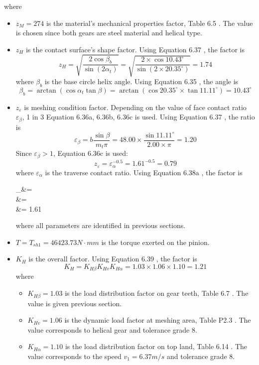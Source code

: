 where
\begin{itemize}
	\item $ z_M = 274 $ is the material's mechanical properties factor, Table 6.5 \cite{tk1}. The value is chosen since both gears are steel material and helical type.
	\item $ z_H $ is the contact surface's shape factor. Using Equation 6.37 \cite{tk1}, the factor is
	\[ z_H = \sqrt{\dfrac{2\cos\beta_b}{\sin(2\alpha_t)}} = \sqrt{\dfrac{2\times\cos 10.43^\circ}{\sin(2\times 20.35^\circ)}} = 1.74\]
	where $ \beta_b $ is the base circle helix angle. Using Equation 6.35 \cite{tk1}, the angle is
	\[ \beta_b = \arctan\left( \cos\alpha_t\tan\beta\right) = \arctan\left( \cos 20.35^\circ \times \tan 11.11^\circ\right) = 10.43^\circ\]
	\item $ z_\varepsilon $ is meshing condition factor. Depending on the value of face contact ratio $ \varepsilon_\beta $, 1 in 3 Equation 6.36a, 6.36b, 6.36c \cite{tk1} is used. Using Equation 6.37 \cite{tk1}, the ratio is
	\[\varepsilon_\beta = b\dfrac{\sin\beta}{m_t\pi} = 48.00\times\dfrac{\sin 11.11^\circ}{2.00\times\pi}=1.20\]
	Since $ \varepsilon_\beta >1 $, Equation 6.36c \cite{tk1} is used:
	\[z_\varepsilon = \varepsilon_\alpha^{-0.5} = 1.61^{-0.5} = 0.79\]	
	where $ \varepsilon_\alpha $ is the traverse contact ratio. Using Equation 6.38a \cite{tk1}, the factor is
	\begin{flalign*}
	\varepsilon_\alpha &= \\
	&= \\
	&= 1.61
	\end{flalign*}
	where all parameters are identified in previous sections.
	\item $ T=T_{sh1}=46423.73\unit{N\cdot mm} $ is the torque exerted on the pinion.
	\item $ K_H $ is the overall factor. Using Equation 6.39 \cite{tk1}, the factor is
	\[ K_H = K_{H\beta}K_{Hv}K_{H\alpha} = 1.03\times 1.06 \times 1.10  = 1.21\]
	where
	\begin{itemize}
		\item $ K_{H\beta} = 1.03 $ is the load distribution factor on gear teeth, Table 6.7 \cite{tk1}. The value is given previous section.
		\item $ K_{Hv} = 1.06 $ is the dynamic load factor at meshing area, Table P2.3 \cite{tk1}. The value corresponds to helical gear and tolerance grade 8.
		\item $ K_{H\alpha} = 1.10 $ is the load distribution factor on top land, Table 6.14 \cite{tk1}. The value corresponds to the speed $ v_1=6.37\unit{m/s} $ and tolerance grade 8.
	\end{itemize}
\end{itemize}

